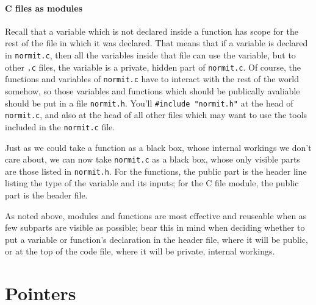 \documentclass[12pt]{article}
\begin{document}
\paragraph{C files as modules}
Recall that a variable which is not declared inside a function has scope for the rest of the file in
which it was declared. That means that if a variable is declared in {\tt normit.c}, then all the variables
inside that file can use the variable, but to other {\tt .c} files, the variable is
a private, hidden part of {\tt normit.c}. Of course, the functions and variables of {\tt normit.c} have
to interact with the rest of the world somehow, so those variables and functions which should be
publically avaliable should be put in a file {\tt normit.h}. You'll {\tt \#include "normit.h"} at the head
of {\tt normit.c}, and also at the head of all other files which may want to use the tools included in
the {\tt normit.c} file.

Just as we could take a function as a black box, whose internal workings
we don't care about, we can now take {\tt normit.c} as a black box,
whose only visible parts are those listed in {\tt normit.h}. For the functions, the public part is the
header line listing the type of the variable and its inputs; for the C file module, the public part is
the header file. 

As noted above, modules and functions are most effective and  reuseable when as few
subparts are visible as possible; bear this in mind when deciding whether to put a variable or
function's declaration in the header file, where it will be public, or at the top of the code file,
where it will be private, internal workings.

 \label{prepointers}\section{Pointers} \label{pointers} 
\end{document}
